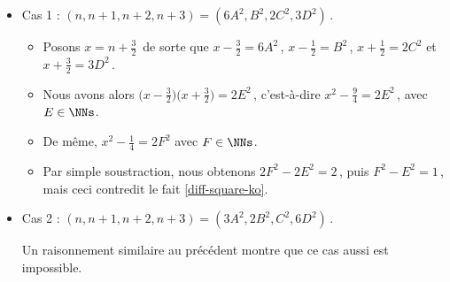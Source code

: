 \begin{itemize}
	\item Cas 1 : $(n, n+1, n+2, n+3) = (6A^2, B^2, 2C^2, 3D^2)$\,.
	\begin{itemize}
    	\item Posons $x = n + \frac32$\, de sorte que 
    	$x - \frac32 = 6 A^2$\,, $x - \frac12 = B^2$\,, $x + \frac12 = 2 C^2$ et $x + \frac32 = 3 D^2$\,.
    
    	\item Nous avons alors
    	$\big( x - \frac32 \big) \big( x + \frac32 \big) = 2 E^2$\,, c'est-à-dire $x^2 - \frac94 = 2 E^2$\,, avec $E \in \NNs$.
    
    	\item De même,
    	$x^2 - \frac14 = 2 F^2$ avec $F \in \NNs$.	
    
    	\item Par simple soustraction, nous obtenons $2 F^2 - 2 E^2 = 2$\,, puis $F^2 - E^2 = 1$\,, mais ceci contredit le fait \ref{diff-square-ko}.
    \end{itemize}
	
	
	\item Cas 2 : $(n, n+1, n+2, n+3) = (3A^2, 2B^2, C^2, 6D^2)$\,.
		
	\smallskip
	\noindent
	Un raisonnement similaire au précédent montre que ce cas aussi est impossible. \qedhere
\end{itemize}